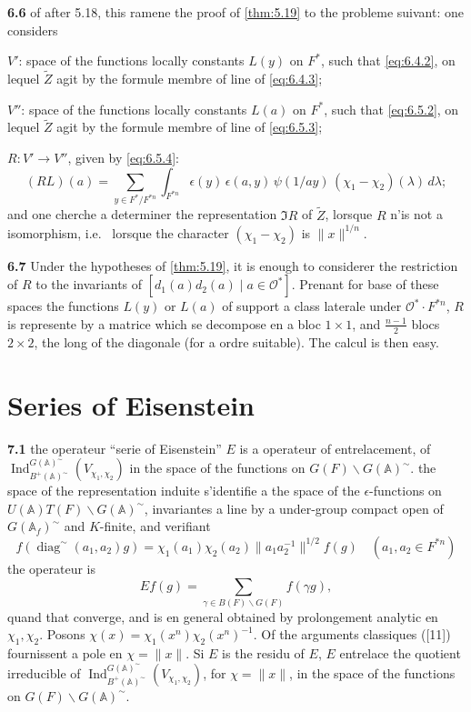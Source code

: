 \documentclass[12pt,a4paper]{article}
\theoremstyle{plain}
\theoremstyle{definition}
\theoremstyle{remark}
\DeclareMathOperator{\Ind}{Ind}
\DeclareMathOperator{\diag}{diag}
\newcommand{\Af}{\mathbb{A}}
\newcommand{\cO}{\mathcal{O}}
\newcommand{\wt}{\widetilde}
\providecommand{\cO}{\mathcal{O}}
\begin{document}
\textbf{6.6} of after 5.18, this ramene the proof of \ref{thm:5.19} to the probleme suivant: one considers

$V'$: space of the functions locally constants $L(y)$ on $F^*$, such that \eqref{eq:6.4.2}, on lequel $\wt{Z}$ agit by the formule membre of line of \eqref{eq:6.4.3};

$V''$: space of the functions locally constants $L(a)$ on $F^*$, such that \eqref{eq:6.5.2}, on lequel $\wt{Z}$ agit by the formule membre of line of \eqref{eq:6.5.3};

$R : V' \to V''$, given by \eqref{eq:6.5.4}:
\[
(RL)(a) = \sum_{y \in F^*/F^{*n}} \int_{F^{*n}} \epsilon(y) \, \epsilon(a, y) \, \psi(1/ay) \, (\chi_1 - \chi_2)(\lambda) \, d\lambda;
\]
and one cherche a determiner the representation $\Im R$ of $\wt{Z}$, lorsque $R$ n'is not a isomorphism, i.e.
\ lorsque the character $(\chi_1 - \chi_2)$ is $\|x\|^{1/n}$.

\textbf{6.7} Under the hypotheses of \ref{thm:5.19}, it is enough to considerer the restriction of $R$ to the invariants of $[d_1(a) d_2(a) \mid a \in \cO^*]$. Prenant for base of these spaces the functions $L(y)$ or $L(a)$ of support a class laterale under $\cO^* \cdot F^{*n}$, $R$ is represente by a matrice which se decompose en a bloc $1 \times 1$, and $\frac{n-1}{2}$ blocs $2 \times 2$, the long of the diagonale (for a ordre suitable). The calcul is then easy.

\section{Series of Eisenstein}

\textbf{7.1} the operateur ``serie of Eisenstein'' $E$ is a operateur of entrelacement, of $\Ind_{B^+(\Af)^\sim}^{G(\Af)^\sim}(V_{\chi_1, \chi_2})$ in the space of the functions on $G(F) \backslash G(\Af)^\sim$. the space of the representation induite s'identifie a the space of the $\epsilon$-functions on $U(\Af) T(F) \backslash G(\Af)^\sim$, invariantes a line by a under-group compact open of $G(\Af_f)^\sim$ and $K$-finite, and verifiant
\[
f(\diag^\sim(a_1, a_2) g) = \chi_1(a_1) \chi_2(a_2) \|a_1 a_2^{-1}\|^{1/2} f(g) \quad (a_1, a_2 \in F^{*n})
\]
the operateur is
\[
Ef(g) = \sum_{\gamma \in B(F) \backslash G(F)} f(\gamma g),
\]
quand that converge, and is en general obtained by prolongement analytic en $\chi_1, \chi_2$. Posons $\chi(x) = \chi_1(x^n) \chi_2(x^n)^{-1}$. Of the arguments classiques ([11]) fournissent a pole en $\chi = \|x\|$. Si $E$ is the residu of $E$, $E$ entrelace the quotient irreducible of $\Ind_{B^+(\Af)^\sim}^{G(\Af)^\sim}(V_{\chi_1, \chi_2})$, for $\chi = \|x\|$, in the space of the functions on $G(F) \backslash G(\Af)^\sim$.
\end{document}

